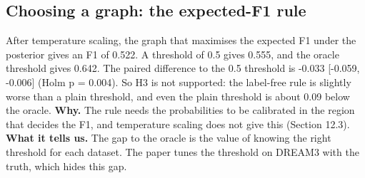 \documentclass[10pt]{article}
\begin{document}
\subsection{Choosing a graph: the expected-F1 rule}
After temperature scaling, the graph that maximises the expected F1 under the posterior gives an F1 of 0.522. A threshold of 0.5 gives 0.555, and the oracle threshold gives 0.642. The paired difference to the 0.5 threshold is -0.033 [-0.059, -0.006] (Holm p = 0.004). So H3 is not supported: the label-free rule is slightly worse than a plain threshold, and even the plain threshold is about 0.09 below the oracle. \textbf{Why.} The rule needs the probabilities to be calibrated in the region that decides the F1, and temperature scaling does not give this (Section 12.3). \textbf{What it tells us.} The gap to the oracle is the value of knowing the right threshold for each dataset. The paper tunes the threshold on DREAM3 with the truth, which hides this gap.
\end{document}
